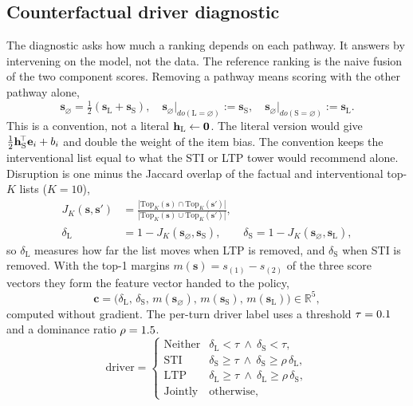 \subsection{Counterfactual driver diagnostic}
\label{sec:cf}
The diagnostic asks how much a ranking depends on each pathway. It answers by intervening on the model, not the data. The reference ranking is the naive fusion of the two component scores. Removing a pathway means scoring with the other pathway alone,
\begin{equation}
  \label{eq:naive}
  \mathbf{s}_{\varnothing}=\tfrac{1}{2}(\mathbf{s}_{\mathrm{L}}+\mathbf{s}_{\mathrm{S}}),\quad
  \mathbf{s}_{\varnothing}\big|_{do(\mathrm{L}=\varnothing)}:=\mathbf{s}_{\mathrm{S}},\quad
  \mathbf{s}_{\varnothing}\big|_{do(\mathrm{S}=\varnothing)}:=\mathbf{s}_{\mathrm{L}} .
\end{equation}
This is a convention, not a literal $\mathbf{h}_{\mathrm{L}}\leftarrow\mathbf{0}$. The literal version would give $\tfrac12\mathbf{h}_{\mathrm{S}}^{\!\top}\mathbf{e}_i+b_i$ and double the weight of the item bias. The convention keeps the interventional list equal to what the STI or LTP tower would recommend alone. Disruption is one minus the Jaccard overlap of the factual and interventional top-$K$ lists ($K=10$),
\begin{align}
  J_K(\mathbf{s},\mathbf{s}') &= \frac{|\mathrm{Top}_K(\mathbf{s})\cap\mathrm{Top}_K(\mathbf{s}')|}{|\mathrm{Top}_K(\mathbf{s})\cup\mathrm{Top}_K(\mathbf{s}')|}, \label{eq:jaccard}\\
  \delta_{\mathrm{L}} &= 1-J_K(\mathbf{s}_{\varnothing},\mathbf{s}_{\mathrm{S}}),\qquad
  \delta_{\mathrm{S}} = 1-J_K(\mathbf{s}_{\varnothing},\mathbf{s}_{\mathrm{L}}), \label{eq:delta}
\end{align}
so $\delta_{\mathrm{L}}$ measures how far the list moves when LTP is removed, and $\delta_{\mathrm{S}}$ when STI is removed. With the top-1 margins $m(\mathbf{s})=s_{(1)}-s_{(2)}$ of the three score vectors they form the feature vector handed to the policy,
\begin{equation}
  \label{eq:cffeat}
  \mathbf{c}=\big(\delta_{\mathrm{L}},\,\delta_{\mathrm{S}},\,m(\mathbf{s}_{\varnothing}),\,m(\mathbf{s}_{\mathrm{S}}),\,m(\mathbf{s}_{\mathrm{L}})\big)\in\mathbb{R}^{5},
\end{equation}
computed without gradient. The per-turn driver label uses a threshold $\tau=0.1$ and a dominance ratio $\rho=1.5$.
\begin{equation}
  \label{eq:driver}
  \mathrm{driver}=
  \begin{cases}
    \text{Neither} & \delta_{\mathrm{L}}<\tau \ \wedge\ \delta_{\mathrm{S}}<\tau,\\
    \text{STI} & \delta_{\mathrm{S}}\ge\tau \ \wedge\ \delta_{\mathrm{S}}\ge\rho\,\delta_{\mathrm{L}},\\
    \text{LTP} & \delta_{\mathrm{L}}\ge\tau \ \wedge\ \delta_{\mathrm{L}}\ge\rho\,\delta_{\mathrm{S}},\\
    \text{Jointly} & \text{otherwise},
  \end{cases}
\end{equation}
